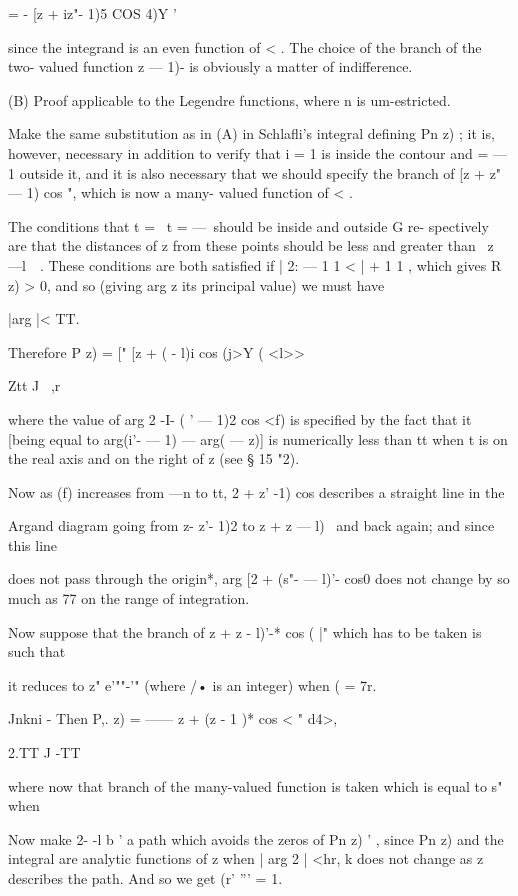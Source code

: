 {{= - [z + iz"- 1)5 COS 4)Y '



since the integrand is an even function of < . The choice of the
branch of the two- valued function z — 1)- is obviously a matter of
indifference.

(B) Proof applicable to the Legendre functions, where n is
um-estricted.

Make the same substitution as in (A) in Schlafli's integral defining
Pn z) ; it is, however, necessary in addition to verify that i = 1 is
inside the contour and = — 1 outside it, and it is also necessary that
we should specify the branch of [z + z" — 1) cos ", which is now a
many- valued function of < .

The conditions that t = \, t = —\ should be inside and outside G re-
spectively are that the distances of z from these points should be
less and greater than \ z —l\ \ . These conditions are both satisfied
if | 2: — 1 1 < | + 1 1 , which gives R z) > 0, and so (giving arg z
its principal value) we must have

|arg |< TT.

Therefore P z) = [" [z + ( - l)i cos (j>Y ( <l>>

Ztt J \ ,r

where the value of arg 2 -I- ( ' — 1)2 cos <f) is specified by the
fact that it [being equal to arg(i'- — 1) — arg( — z)] is numerically
less than tt when t is on the real axis and on the right of z (see §
15 "2).

Now as (f) increases from —n to tt, 2 + z' -1) cos describes a
straight line in the

Argand diagram going from z- z'- 1)2 to z + z — l)~ and back again;
and since this line

does not pass through the origin*, arg [2 + (s"- — l)'- cos0 does not
change by so much as 77 on the range of integration.

Now suppose that the branch of z + z - l)'-* cos ( |" which has to be
taken is such that

it reduces to z" e'""-'" (where /• is an integer) when ( = 7r.

Jnkni - Then P,. z) = —— z + (z - 1 )* cos < " d4>,

2.TT J -TT

where now that branch of the many-valued function is taken which is
equal to s" when

Now make 2- -l b ' a path which avoids the zeros of Pn z) ' , since Pn
z) and the integral are analytic functions of z when | arg 2 | <hr, k
does not change as z describes the path. And so we get (r' ''' = 1.

}}
